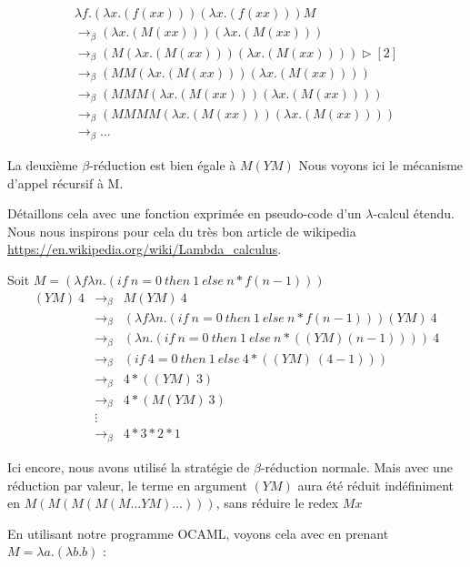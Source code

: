 \documentclass[11pt]{book}
\begin{document}
$$
\begin{array}{l}
\lambda f . (\lambda x . (f (x x))) (\lambda x . (f (x x))) M \\
\rightarrow _\beta (\lambda x . (M (xx)))(\lambda x . (M(xx))) \\
\rightarrow _\beta  (M(\lambda x . (M(xx)))(\lambda x . (M(xx))))  \triangleright [2] \\
\rightarrow _\beta  (MM(\lambda x . (M(xx)))(\lambda x . (M(xx)))) \\
\rightarrow _\beta  (MMM(\lambda x . (M(xx)))(\lambda x . (M(xx)))) \\
\rightarrow _\beta  (MMMM(\lambda x . (M(xx)))(\lambda x . (M(xx)))) \\
\rightarrow _\beta  \ldots
\end{array}
$$


La deuxième $\beta$-r\'{e}duction est bien \'{e}gale \`{a} $M (Y M)$
Nous voyons ici le mécanisme d'appel récursif à M. 

Détaillons cela avec une fonction exprimée en pseudo-code d'un $\lambda$-calcul étendu.
Nous nous inspirons pour cela du très bon article de wikipedia \url{https://en.wikipedia.org/wiki/Lambda_calculus}.


Soit $M = (\lambda f \lambda n .(if\ n=0\ then\ 1\ else\ n*f(n-1)))$
$$
\begin{array}{lll}
(YM)\ 4 & \rightarrow _\beta & M (YM)\ 4 \\
& \rightarrow _\beta & (\lambda f \lambda n .(if\ n=0\ then\ 1\ else\ n*f(n-1))) (YM)\ 4 \\
& \rightarrow _\beta & (\lambda  n . (if\ n=0\ then\ 1\ else\ n*((YM) (n-1))))\ 4 \\
& \rightarrow _\beta & (if\ 4=0\ then\ 1\ else\ 4*((YM)\ (4-1))) \\
& \rightarrow _\beta & 4 * ((YM)\ 3) \\
& \rightarrow _\beta & 4 * (M(YM)\ 3) \\
& \vdots & \\
& \rightarrow _\beta & 4 * 3 * 2 * 1 
\end{array}
$$

Ici encore, nous avons utilisé la stratégie de $\beta$-réduction normale. 
Mais avec une réduction par valeur, le terme en argument $(YM)$ aura été réduit indéfiniment en $M(M(M(M(M\ldots YM)\ldots)))$,
sans réduire le redex $Mx$


En utilisant notre programme OCAML, voyons cela avec en prenant $M = \lambda a. (\lambda b . b) $ :
\end{document}
